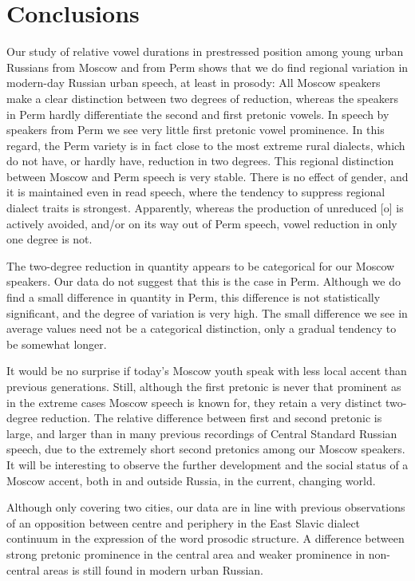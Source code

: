\documentclass[output=paper]{langscibook}
\begin{document}
\section{Conclusions}
\label{sec:post:5}
Our study of relative vowel durations in prestressed position among young urban Russians from Moscow and from Perm shows that we do find regional variation in modern-day Russian urban speech, at least in prosody: All Moscow speakers make a clear distinction between two degrees of reduction, whereas the speakers in Perm hardly differentiate the second and first pretonic vowels. In speech by speakers from Perm we see very little first pretonic vowel prominence. In this regard, the Perm variety is in fact close to the most extreme rural dialects, which do not have, or hardly have, reduction in two degrees. This regional distinction between Moscow and Perm speech is very stable. There is no effect of gender, and it is maintained even in read speech, where the tendency to suppress regional dialect traits is strongest. Apparently, whereas the production of unreduced [o] is actively avoided, and/or on its way out of Perm speech, vowel reduction in only one degree is not.



The two-degree reduction in quantity appears to be categorical for our Moscow speakers. Our data do not suggest that this is the case in Perm. Although we do find a small difference in quantity in Perm, this difference is not statistically significant, and the degree of variation is very high. The small difference we see in average values need not be a categorical distinction, only a gradual tendency to be somewhat longer.



It would be no surprise if today’s Moscow youth speak with less local accent than previous generations. Still, although the first pretonic is never that prominent as in the extreme cases Moscow speech is known for, they retain a very distinct two-degree reduction. The relative difference between first and second pretonic is large, and larger than in many previous recordings of Central Standard Russian speech, due to the extremely short second pretonics among our Moscow speakers. It will be interesting to observe the further development and the social status of a Moscow accent, both in and outside Russia, in the current, changing world.



Although only covering two cities, our data are in line with previous observations of an opposition between centre and periphery in the East Slavic dialect continuum in the expression of the word prosodic structure. A difference between strong pretonic prominence in the central area and weaker prominence in non-central areas is still found in modern urban Russian.
\end{document}
